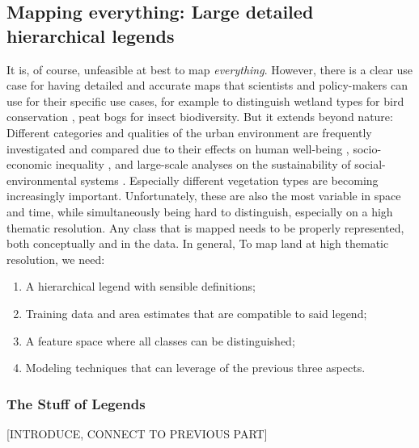     \subsection{Mapping everything: Large detailed hierarchical legends}

        It is, of course, unfeasible at best to map \textit{everything}. However, there is a clear use case for having detailed and accurate maps that scientists and policy-makers can use for their specific use cases, for example to distinguish wetland types for bird conservation \citep{fan2021function}, peat bogs \citep{spitzer2006insect} for insect biodiversity. But it extends beyond nature: Different categories and qualities of the urban environment are frequently investigated and compared due to their effects on human well-being \citep{krekel2016greener}, socio-economic inequality \citep{tian2024urban}, and large-scale analyses on the sustainability of social-environmental systems \citep{chen2022sustainability}. Especially different vegetation types are becoming increasingly important. Unfortunately, these are also the most variable in space and time, while simultaneously being hard to distinguish, especially on a high thematic resolution. Any class that is mapped needs to be properly represented, both conceptually and in the data. In general, To map land at high thematic resolution, we need:
        \begin{enumerate}
            \item A hierarchical legend with sensible definitions;
            \item Training data and area estimates that are compatible to said legend;
            \item A feature space where all classes can be distinguished;
            \item Modeling techniques that can leverage of the previous three aspects.
        \end{enumerate}

        \subsubsection{The Stuff of Legends}

        [INTRODUCE, CONNECT TO PREVIOUS PART]

